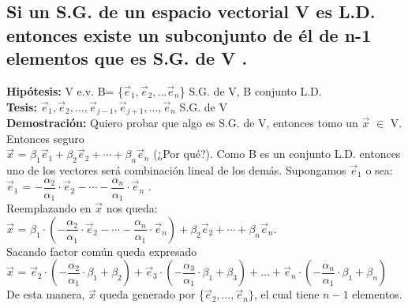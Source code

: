 \documentclass[11pt]{article}
\begin{document}
\subsection{Si un S.G. de un espacio vectorial V es L.D. entonces existe un subconjunto de él de n-1 elementos que es S.G. de V .}
{\bfseries {Hipótesis:}} V e.v. B= \{$\vec{e}_{1}, \vec{e}_2,... \vec{e}_n $\} S.G. de V, B conjunto L.D. \\
{\bfseries {Tesis:}} $\vec{e}_1 , \vec{e}_2 , \hdots , \vec{e}_{j-1} , \vec{e}_{j+1} , \hdots , \vec{e}_n$ S.G. de V\\
{\bfseries Demostración:} Quiero probar que algo es S.G. de V, entonces tomo un $\vec{x}$ $\in$ V. Entonces seguro\\ $\vec{x}$ = $\beta_1\vec{e}_1+\beta_2\vec{e}_2+\cdots+\beta_n\vec{e}_n$ (¿Por qué?). Como B es un conjunto L.D. entonces uno de los vectores será combinación lineal de los demás. Supongamos $\vec{e}_1$ o sea: \\
$\vec{e}_1$ = $-\dfrac{\alpha_2}{\alpha_1}\cdot\vec{e}_2 - \cdots - \dfrac{\alpha_n}{\alpha_1}\cdot\vec{e}_n$ . \\
Reemplazando en $\vec{x}$ nos queda: \\
$\vec{x}$ = $\beta_1 \cdot (-\dfrac{\alpha_2}{\alpha_1}\cdot\vec{e}_2 - \cdots - \dfrac{\alpha_n}{\alpha_1}\cdot\vec{e}_n)+\beta_2\vec{e}_2+\cdots+\beta_n\vec{e}_n $. \\
Sacando factor común queda expresado\\ $\vec{x}$ = $\vec{e}_2 \cdot (- \dfrac{\alpha_2}{\alpha_1} \cdot \beta_1 + \beta_2) + \vec{e}_3 \cdot (- \dfrac{\alpha_3}{\alpha_1} \cdot \beta_1 + \beta_3) + \hdots + \vec{e}_n \cdot (-\dfrac{\alpha_n}{\alpha_1} \cdot \beta_1 + \beta_n)$  \\
De esta manera, $\vec{x}$ queda generado por \{$\vec{e}_2,\hdots,\vec{e}_n\}$, el cual tiene $n-1$ elementos. 
\end{document}
